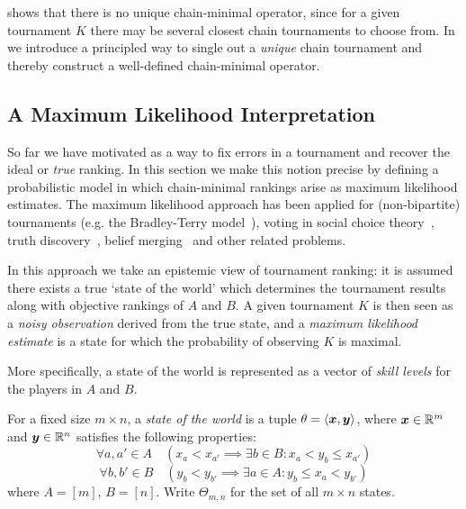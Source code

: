  shows that there is no unique chain-minimal operator, since for
a given tournament $K$ there may be several closest chain tournaments to choose
from. In  we introduce a principled way to
single out a \emph{unique} chain tournament and thereby construct a
well-defined chain-minimal operator.

\subsection{A Maximum Likelihood Interpretation}
\label{tourn_sec_mle}

So far we have motivated \chainmin{} as a way to fix
errors in a tournament and recover the ideal or \emph{true} ranking. In this
section we make this notion precise by defining a probabilistic model in which
chain-minimal rankings arise as maximum likelihood estimates.
%
The maximum likelihood approach has been applied for (non-bipartite)
tournaments (e.g. the Bradley-Terry
model~\cite{bradley_terry_52,gonzalez2014paired}), voting in social choice
theory~\cite{elkind2016rationalizations}, truth
discovery~\cite{wang_truth_2012}, belief merging~\cite{everaere2020} and other
related problems.

In this approach we take an epistemic view of tournament ranking: it is assumed
there exists a true `state of the world' which determines the tournament
results along with objective rankings of $A$ and $B$. A given
tournament $K$ is then seen as a \emph{noisy observation} derived from the
true state, and a \emph{maximum likelihood estimate} is a state for which the
probability of observing $K$ is maximal.

More specifically, a state of the world is represented as a vector of
\emph{skill levels} for the players in $A$ and $B$.\footnotemark{}


\begin{definition}
   \label{tourn_def_stateworld}

    For a fixed size $m \times n$, a \emph{state of the world} is a tuple
    $\theta = \langle {\bm{x}, \bm{y}} \rangle$, where $\bm{x} \in \mathbb{R}^m$ and
    $\bm{y} \in \mathbb{R}^n$ satisfies the following properties:
   \begin{equation}
        \forall a, a' \in A \quad (
            x_a < x_{a'} \implies \exists b \in B: x_a < y_b \le x_{a'}
        )
        \label{tourn_eqn_state_condition_a}
   \end{equation}
   \begin{equation}
        \forall b, b' \in B \quad(
            y_b < y_{b'} \implies \exists a \in A: y_b \le x_a < y_{b'}
        )
        \label{tourn_eqn_state_condition_b}
   \end{equation}
   where $A = [m]$, $B = [n]$. Write $\Theta_{m,n}$ for the set of all $m
   \times n$ states.

\end{definition}

